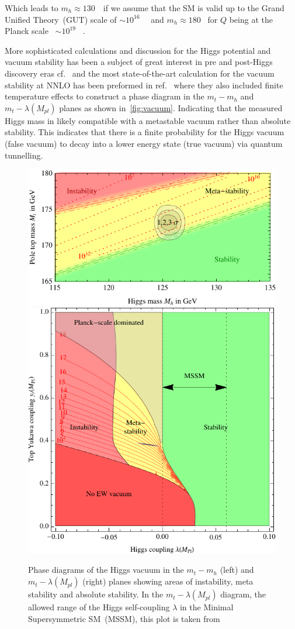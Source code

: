 Which leads to $ m_h \approx 130$\ \GeV \ if we assume that the SM is valid up to the Grand Unified Theory~(GUT) scale of $ \sim 10^{16}$ \ \GeV \ and $ m_h \approx 180$ \GeV \ for $Q$ being at the Planck scale ~$ \sim 10^{19}$ \ \GeV  . 
\par More sophisticated calculations and discussion for the Higgs potential and vacuum stability has been a subject of great interest in pre and post-Higgs discovery eras cf.~\cite{Lindner:1985uk,Sher:1988mj,Casas:1996aq,Isidori:2001bm} and the most state-of-the-art calculation for the vacuum stability at NNLO has been preformed in ref.~\cite{Degrassi:2012ry} where they also included finite temperature effects to construct a phase diagram in the $m_t-m_h$  and $m_t-\lambda(M_{pl})$ planes as shown in~\autoref{fig:vacuum}.  
Indicating that the measured Higgs mass in likely compatible with a metastable vacuum rather than absolute stability. This indicates that there is a finite probability for the Higgs vacuum  (false vacuum) to decay into a lower energy state (true vacuum) via quantum tunnelling.
\begin{figure}[t!]
	\begin{center}
		\includegraphics[height=0.32\textwidth]{figures/deadoraliveG2012}
		\includegraphics[height=0.32\textwidth]{figures/Ath}
		\caption{Phase diagrams of the Higgs vacuum in the $m_t-m_h$ (left) and  $m_t-\lambda(M_{pl})$ (right) planes showing areas of instability, meta stability and absolute stability. In the  $m_t-\lambda(M_{pl})$ diagram, the allowed range of the Higgs self-coupling $\lambda$ in the Minimal Supersymmetric SM~(MSSM), this plot is taken from ~\cite{Degrassi:2012ry} }
		\label{fig:vacuum}
	\end{center}
\end{figure}
